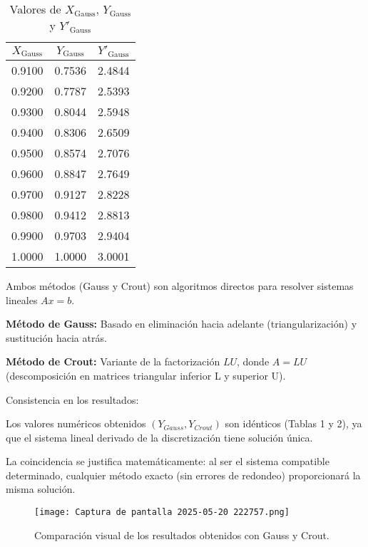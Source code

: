 \documentclass[11pt]{article}
\begin{document}
\begin{table}[H]
\centering
\caption{Valores de \(X_{\text{Gauss}}\), \(Y_{\text{Gauss}}\) y \(Y'_{\text{Gauss}}\)}
\label{tab:gauss_data}
\begin{tabular}{@{}ccc@{}}
\toprule
\(X_{\text{Gauss}}\) & \(Y_{\text{Gauss}}\) & \(Y'_{\text{Gauss}}\) \\ \midrule

0.9100  & 0.7536 & 2.4844 \\
0.9200  & 0.7787 & 2.5393 \\
0.9300  & 0.8044 & 2.5948 \\
0.9400  & 0.8306 & 2.6509 \\
0.9500  & 0.8574 & 2.7076 \\
0.9600  & 0.8847 & 2.7649 \\
0.9700  & 0.9127 & 2.8228 \\
0.9800  & 0.9412 & 2.8813 \\
0.9900  & 0.9703 & 2.9404 \\
1.0000  & 1.0000 & 3.0001 \\ \bottomrule
\end{tabular}
\end{table}


Ambos métodos (Gauss y Crout) son algoritmos directos para resolver sistemas lineales $Ax=b$.

\textbf{Método de Gauss:} Basado en eliminación hacia adelante (triangularización) y sustitución hacia atrás.

\textbf{Método de Crout:} Variante de la factorización $LU$, donde $A=LU$ (descomposición en matrices triangular inferior L y superior U).

Consistencia en los resultados:

Los valores numéricos obtenidos $(Y_{Gauss}, Y_{Crout})$ son idénticos (Tablas 1 y 2), ya que el sistema lineal derivado de la discretización tiene solución única.

La coincidencia se justifica matemáticamente: al ser el sistema compatible determinado, cualquier método exacto (sin errores de redondeo) proporcionará la misma solución.
\begin{figure}[H]
    \centering
    \texttt{[image: Captura de pantalla 2025-05-20 222757.png]} %
    \caption{Comparación visual de los resultados obtenidos con Gauss y Crout.}
    \label{fig:comparacion}
\end{figure}
\end{document}
